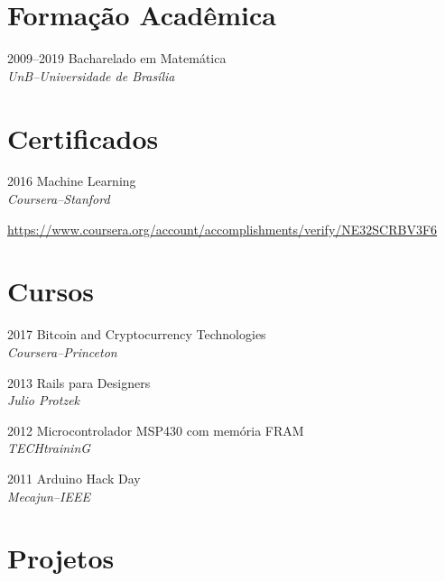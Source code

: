 \documentclass[a4paper,twoside]{simplecv}
\begin{document}
\section{Formação Acadêmica}

\begin{topic}
\item[2009--2019] Bacharelado em Matemática\\
	{\em\small UnB--Universidade de Brasília}

\end{topic}

\section{Certificados}

\begin{topic}
\item[2016] Machine Learning\\
	{\em\small Coursera--Stanford}

	{\scriptsize\url{https://www.coursera.org/account/accomplishments/verify/NE32SCRBV3F6}}
\end{topic}

\section{Cursos}

\begin{topic}
\item[2017] Bitcoin and Cryptocurrency Technologies\\
	{\em\small Coursera--Princeton}
\item[2013] Rails para Designers\\
	{\em\small Julio Protzek}
\item[2012] Microcontrolador MSP430 com memória FRAM\\
	{\em\small TECHtraininG}
\item[2011] Arduino Hack Day\\
	{\em\small Mecajun--IEEE}
\end{topic}

\section{Projetos}
\end{document}
